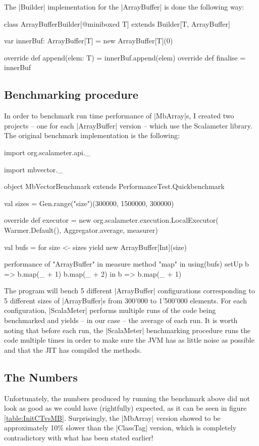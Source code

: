 The |Builder| implementation for the |ArrayBuffer| is done the following way:

\begin{lstlisting-nobreak}
class ArrayBufferBuilder[@miniboxed T] extends Builder[T, ArrayBuffer] {

  var innerBuf: ArrayBuffer[T] = new ArrayBuffer[T](0)

  override def append(elem: T) = innerBuf.append(elem)
  override def finalise = innerBuf
}
\end{lstlisting-nobreak}

\subsection{Benchmarking procedure}

In order to benchmark run time performance of |MbArray|s, I created two projects -- one for each |ArrayBuffer| version -- which use the Scalameter library. The original benchmark implementation is the following:

\begin{lstlisting-nobreak}
import org.scalameter.api._

import mbvector._

object MbVectorBenchmark extends PerformanceTest.Quickbenchmark {
  val sizes = Gen.range("size")(300000, 1500000, 300000)

  override def executor = new org.scalameter.execution.LocalExecutor(
    Warmer.Default(),
    Aggregator.average,
    measurer)

  val bufs = for {
    size <- sizes
  } yield new ArrayBuffer[Int](size)

  performance of "ArrayBuffer" in {
    measure method "map" in {
      using(bufs) setUp {
        b => 
          b.map(_ + 1)
          b.map(_ + 2)
      } in {
        b => b.map(_ + 1)
      }
    }
  }
}
\end{lstlisting-nobreak}

The program will bench 5 different |ArrayBuffer| configurations corresponding to 5 different sizes of |ArrayBuffer|s from 300'000 to 1'500'000 elements. For each configuration, |ScalaMeter| performs multiple runs of the code being benchmarked and yields -- in our case -- the average of each run. It is worth noting that before each run, the |ScalaMeter| benchmarking procedure runs the code multiple times in order to make sure the JVM has as little noise as possible and that the JIT has compiled the methods.

\subsection{The Numbers}

Unfortunately, the numbers produced by running the benchmark above did not look as good as we could have (rightfully) expected, as it can be seen in figure \ref{table:InitCTvsMB}.
Surprisingly, the |MbArray| version showed to be approximately 10\% slower than the |ClassTag| version, which is completely contradictory with what has been stated earlier!



